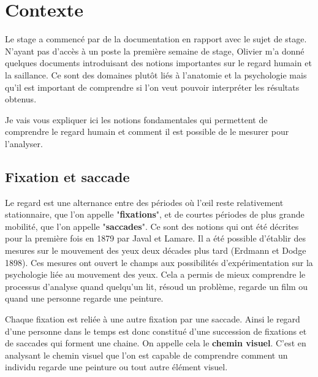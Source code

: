 \chapter{Contexte}
\par
Le stage a commencé par de la documentation en rapport avec le sujet de stage. N'ayant pas d'accès à un poste la première semaine de stage, Olivier m'a donné quelques documents introduisant des notions importantes sur le regard humain et la saillance. Ce sont des domaines plutôt liés à l'anatomie et la psychologie mais qu'il est important de comprendre si l'on veut pouvoir interpréter les résultats obtenus.
\par
Je vais vous expliquer ici les notions fondamentales qui permettent de comprendre le regard humain et comment il est possible de le mesurer pour l'analyser.

\section{Fixation et saccade}
\label{section:fix_sacc}
\par
Le regard est une alternance entre des périodes où l'\oe{}il reste relativement stationnaire, que l'on appelle "\textbf{fixations}", et de courtes périodes de plus grande mobilité, que l'on appelle "\textbf{saccades}"\cite{gaze}. Ce sont des notions qui ont été décrites pour la première fois en 1879 par Javal et Lamare. Il a été possible d'établir des mesures sur le mouvement des yeux deux décades plus tard (Erdmann et Dodge 1898). Ces mesures ont ouvert le champs aux possibilités d'expérimentation sur la psychologie liée au mouvement des yeux. Cela a permis de mieux comprendre le processus d'analyse quand quelqu'un lit, résoud un problème, regarde un film ou quand une personne regarde une peinture.

\par
Chaque fixation est reliée à une autre fixation par une saccade. Ainsi le regard d'une personne dans le temps est donc constitué d'une succession de fixations et de saccades qui forment une chaine. On appelle cela le \textbf{chemin visuel}. C'est en analysant le chemin visuel que l'on est capable de comprendre comment un individu regarde une peinture ou tout autre élément visuel.

